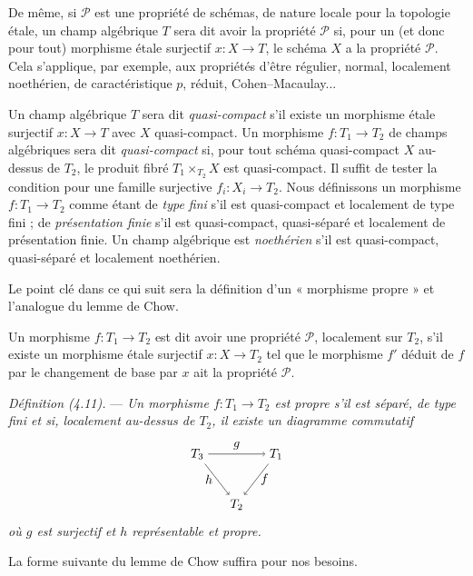 \documentclass[10pt]{article}
\begin{document}
De même, si $\mathcal P$ est une propriété de schémas, de nature locale pour la topologie étale, un champ algébrique $T$ sera dit avoir la propriété $\mathcal P$ si, pour un (et donc pour tout) morphisme étale surjectif $x:X\to T$, le schéma $X$ a la propriété $\mathcal P$. Cela s'applique, par exemple, aux propriétés d'être régulier, normal, localement noethérien, de caractéristique $p$, réduit, Cohen--Macaulay...

Un champ algébrique $T$ sera dit \emph{quasi-compact} s'il existe un morphisme étale surjectif $x:X\to T$ avec $X$ quasi-compact. Un morphisme $f:T_1\to T_2$ de champs algébriques sera dit \emph{quasi-compact} si, pour tout schéma quasi-compact $X$ au-dessus de $T_2$, le produit fibré $T_1\times_{T_2}X$ est quasi-compact. Il suffit de tester la condition pour une famille surjective $f_i:X_i\to T_2$. Nous définissons un morphisme $f:T_1\to T_2$ comme étant de \emph{type fini} s'il est quasi-compact et localement de type fini ; de \emph{présentation finie} s'il est quasi-compact, quasi-séparé et localement de présentation finie. Un champ algébrique est \emph{noethérien} s'il est quasi-compact, quasi-séparé et localement noethérien.

Le point clé dans ce qui suit sera la définition d'un « morphisme propre » et l'analogue du lemme de Chow.

Un morphisme $f:T_1\to T_2$ est dit avoir une propriété $\mathcal P$, localement sur $T_2$, s'il existe un morphisme étale surjectif $x:X\to T_2$ tel que le morphisme $f'$ déduit de $f$ par le changement de base par $x$ ait la propriété $\mathcal P$.

\medskip
\noindent\emph{Définition (4.11).} --- \emph{Un morphisme $f:T_1\to T_2$ est propre s'il est séparé, de type fini et si, localement au-dessus de $T_2$, il existe un diagramme commutatif}
\[
\begin{tikzpicture}[baseline=(current bounding box.center)]
\node (T3) at (0,1.4) {$T_3$};
\node (T1) at (2.2,1.4) {$T_1$};
\node (T2) at (1.1,0) {$T_2$};
\draw[->] (T3) -- node[above] {$g$} (T1);
\draw[->] (T1) -- node[right] {$f$} (T2);
\draw[->] (T3) -- node[left] {$h$} (T2);
\end{tikzpicture}
\]
\emph{où $g$ est surjectif et $h$ représentable et propre.}

La forme suivante du lemme de Chow suffira pour nos besoins.
\end{document}
